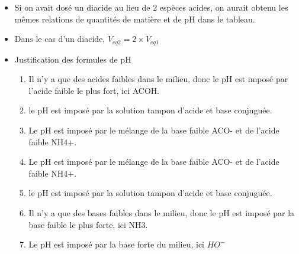 \documentclass[french]{yLectureNote}
\begin{document}
\begin{itemize}
 \item Si on avait dosé un diacide au lieu de 2 espèces acides, on aurait obtenu les m\^emes relations de quantités de matière et de pH dans le tableau.
 \item Dans le cas d'un diacide, \(V_{eq2}=2\times V_{eq1}\)
 \item Justification des formules de pH
 \begin{enumerate}
  \item Il n'y a que des acides faibles dans le milieu, donc le pH est imposé par l'acide faible le plus fort, ici ACOH.
  \item le pH est imposé par la solution tampon d'acide et base conjuguée.
  \item Le pH est imposé par le mélange de la base faible ACO- et de l'acide faible NH4+.
  \item Le pH est imposé par le mélange de la base faible ACO- et de l'acide faible NH4+.
  \item le pH est imposé par la solution tampon d'acide et base conjuguée.
  \item Il n'y a que des bases faibles dans le milieu, donc le pH est imposé par la base faible le plus forte, ici NH3.
  \item Le pH est imposé par la base forte du milieu, ici $HO^-$
 \end{enumerate}

\end{itemize}
\end{document}
